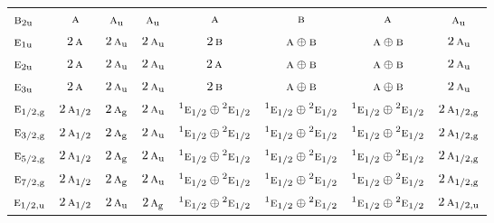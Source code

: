 \documentclass[10pt,a4paper]{article}
\numberwithin{equation}{section}
\newcommand{\irr}[1]{\text{\normalfont\scshape #1}}
\newcommand{\conjpair}[1]{{}^{#1}}
\newcommand{\ptag}[1]{\mathrm{#1}}
\begin{document}
{\begin{longtable}{@{}lccccccc@{}}
$\irr{b}_{2\ptag{u}}$ & $\irr{a}$ & $\irr{a}_{\ptag{u}}$ & $\irr{a}_{\ptag{u}}$ & $\irr{a}$ & $\irr{b}$ & $\irr{a}$ & $\irr{a}_{\ptag{u}}$\\
$\irr{e}_{1\ptag{u}}$ & $2\,\irr{a}$ & $2\,\irr{a}_{\ptag{u}}$ & $2\,\irr{a}_{\ptag{u}}$ & $2\,\irr{b}$ & $\irr{a}\oplus \irr{b}$ & $\irr{a}\oplus \irr{b}$ & $2\,\irr{a}_{\ptag{u}}$\\
$\irr{e}_{2\ptag{u}}$ & $2\,\irr{a}$ & $2\,\irr{a}_{\ptag{u}}$ & $2\,\irr{a}_{\ptag{u}}$ & $2\,\irr{a}$ & $\irr{a}\oplus \irr{b}$ & $\irr{a}\oplus \irr{b}$ & $2\,\irr{a}_{\ptag{u}}$\\
$\irr{e}_{3\ptag{u}}$ & $2\,\irr{a}$ & $2\,\irr{a}_{\ptag{u}}$ & $2\,\irr{a}_{\ptag{u}}$ & $2\,\irr{b}$ & $\irr{a}\oplus \irr{b}$ & $\irr{a}\oplus \irr{b}$ & $2\,\irr{a}_{\ptag{u}}$\\
$\irr{e}_{1/2,\ptag{g}}$ & $2\,\irr{a}_{1/2}$ & $2\,\irr{a}_{\ptag{g}}$ & $2\,\irr{a}_{\ptag{u}}$ & $\conjpair{1}\irr{e}_{1/2}\oplus \conjpair{2}\irr{e}_{1/2}$ & $\conjpair{1}\irr{e}_{1/2}\oplus \conjpair{2}\irr{e}_{1/2}$ & $\conjpair{1}\irr{e}_{1/2}\oplus \conjpair{2}\irr{e}_{1/2}$ & $2\,\irr{a}_{1/2,\ptag{g}}$\\
$\irr{e}_{3/2,\ptag{g}}$ & $2\,\irr{a}_{1/2}$ & $2\,\irr{a}_{\ptag{g}}$ & $2\,\irr{a}_{\ptag{u}}$ & $\conjpair{1}\irr{e}_{1/2}\oplus \conjpair{2}\irr{e}_{1/2}$ & $\conjpair{1}\irr{e}_{1/2}\oplus \conjpair{2}\irr{e}_{1/2}$ & $\conjpair{1}\irr{e}_{1/2}\oplus \conjpair{2}\irr{e}_{1/2}$ & $2\,\irr{a}_{1/2,\ptag{g}}$\\
$\irr{e}_{5/2,\ptag{g}}$ & $2\,\irr{a}_{1/2}$ & $2\,\irr{a}_{\ptag{g}}$ & $2\,\irr{a}_{\ptag{u}}$ & $\conjpair{1}\irr{e}_{1/2}\oplus \conjpair{2}\irr{e}_{1/2}$ & $\conjpair{1}\irr{e}_{1/2}\oplus \conjpair{2}\irr{e}_{1/2}$ & $\conjpair{1}\irr{e}_{1/2}\oplus \conjpair{2}\irr{e}_{1/2}$ & $2\,\irr{a}_{1/2,\ptag{g}}$\\
$\irr{e}_{7/2,\ptag{g}}$ & $2\,\irr{a}_{1/2}$ & $2\,\irr{a}_{\ptag{g}}$ & $2\,\irr{a}_{\ptag{u}}$ & $\conjpair{1}\irr{e}_{1/2}\oplus \conjpair{2}\irr{e}_{1/2}$ & $\conjpair{1}\irr{e}_{1/2}\oplus \conjpair{2}\irr{e}_{1/2}$ & $\conjpair{1}\irr{e}_{1/2}\oplus \conjpair{2}\irr{e}_{1/2}$ & $2\,\irr{a}_{1/2,\ptag{g}}$\\
$\irr{e}_{1/2,\ptag{u}}$ & $2\,\irr{a}_{1/2}$ & $2\,\irr{a}_{\ptag{u}}$ & $2\,\irr{a}_{\ptag{g}}$ & $\conjpair{1}\irr{e}_{1/2}\oplus \conjpair{2}\irr{e}_{1/2}$ & $\conjpair{1}\irr{e}_{1/2}\oplus \conjpair{2}\irr{e}_{1/2}$ & $\conjpair{1}\irr{e}_{1/2}\oplus \conjpair{2}\irr{e}_{1/2}$ & $2\,\irr{a}_{1/2,\ptag{u}}$\\

\end{longtable}}
\end{document}

